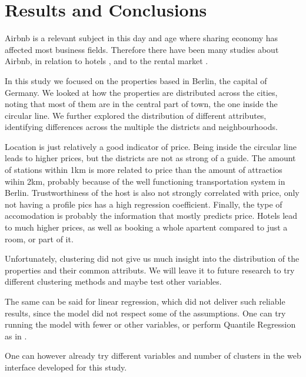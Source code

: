 \section{Results and Conclusions}\label{Sec:Conc}

Airbnb is a relevant subject in this day and age where sharing economy has affected most business fields. Therefore there have been many studies about Airbnb, in relation to hotels \citep{wang2017price}, and to the rental market \citep{coles2017airbnb}.

In this study we focused on the properties based in Berlin, the capital of Germany. We looked at how the properties are distributed across the cities, noting that most of them are in the central part of town, the one inside the circular line. We further explored the distribution of different attributes, identifying differences across the multiple the districts and neighbourhoods.

Location is just relatively a good indicator of price. Being inside the circular line leads to higher prices, but the districts are not as strong of a guide. The amount of stations within 1km is more related to price than the amount of attractios wihin 2km, probably because of the well functioning transportation system in Berlin. Trustworthiness of the host is also not strongly correlated with price, only not having a profile pics has a high regression coefficient. Finally, the type of accomodation is probably the information that mostly predicts price. Hotels lead to much higher prices, as well as booking a whole apartent compared to just a room, or part of it. 
    
Unfortunately, clustering did not give us much insight into the distribution of the properties and their common attributs. We will leave it to future research to try different clustering methods and maybe test other variables.

The same can be said for linear regression, which did not deliver such reliable results, since the model did not respect some of the assumptions. One can try running the model with fewer or other variables, or perform Quantile Regression as in \cite{wang2017price}.

One can however already try different variables and number of clusters in the web interface developed for this study.